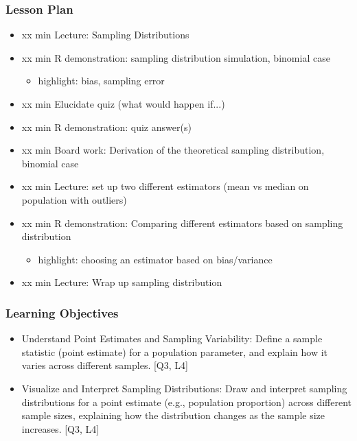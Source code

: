 

\begin{frame}
\frametitle{Lesson Plan}
\begin{itemize}
    \item xx min Lecture: Sampling Distributions
    \item xx min R demonstration: sampling distribution simulation, binomial case
    \begin{itemize}
        \item  highlight: bias, sampling error
    \end{itemize}
    \item xx min Elucidate quiz (what would happen if...)
    \item xx min R demonstration: quiz answer(s)
    \item xx min Board work: Derivation of the theoretical sampling distribution, binomial case
    \item xx min Lecture: set up two different estimators (mean vs median on population with outliers) 
    \item xx min R demonstration: Comparing different estimators based on sampling distribution 
    \begin{itemize}
        \item  highlight: choosing an estimator based on bias/variance
    \end{itemize}
    \item xx min Lecture: Wrap up sampling distribution
\end{itemize}
\end{frame}

\begin{frame}
\frametitle{Learning Objectives}
\begin{itemize}
    \item Understand Point Estimates and Sampling Variability: Define a sample statistic (point estimate) for a population parameter, and explain how it varies across different samples. [Q3, L4] 
    \item Visualize and Interpret Sampling Distributions: Draw and interpret sampling distributions for a point estimate (e.g., population proportion) across different sample sizes, explaining how the distribution changes as the sample size increases. [Q3, L4] 
\end{itemize}
\end{frame}

